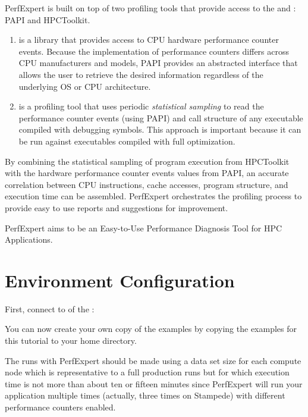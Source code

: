 PerfExpert is built on top of two profiling tools that provide access to the  and : PAPI and HPCToolkit.

\begin{enumerate}
  \item  {} is a library that provides access to CPU hardware performance counter events. Because the implementation of performance counters differs across CPU manufacturers and models, PAPI provides an abstracted interface that allows the user to retrieve the desired information regardless of the underlying OS or CPU architecture.
  \item  {} is a profiling tool that uses periodic \emph{statistical sampling} to read the performance counter events (using PAPI) and call structure of any executable compiled with debugging symbols. This approach is important because it can be run against executables compiled with full optimization.
\end{enumerate}

By combining the statistical sampling of program execution from HPCToolkit with the hardware performance counter events values from PAPI, an accurate correlation between CPU instructions, cache accesses, program structure, and execution time can be assembled. PerfExpert orchestrates the profiling process to provide easy to use reports and suggestions for improvement.

 PerfExpert aims to be an Easy-to-Use Performance Diagnosis Tool for HPC Applications.

\section{Environment Configuration}
\label{sec:Environment_Configuration}

First, connect to \hpcname of the \university:
\begin{prompt}
\end{prompt}

You can now create your own copy of the examples by copying the examples for this tutorial to your home directory.
\begin{prompt}
\end{prompt}

The runs with PerfExpert should be made using a data set size for each compute node which is representative to a full production runs but for which execution time is not more than about ten or fifteen minutes since PerfExpert will run your application multiple times (actually, three times on Stampede) with different performance counters enabled.

